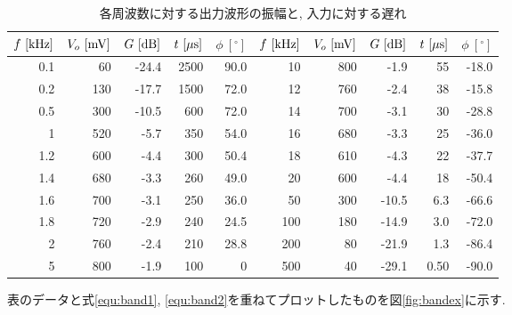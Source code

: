 \documentclass[titlepage]{jsarticle}
\begin{document}
        \begin{table}[h]
            \caption{各周波数に対する出力波形の振幅と, 入力に対する遅れ}
            \label{tab:band}
            \centering
            \begin{tabular}{r|rr|rr||r|rr|rr}
                $f \ [\rm{kHz}]$ & $V_o \ [\rm{mV]}$ & $G \ [\rm{dB}]$ & $t \ [\mu\rm{s}]$ & $\phi \ [^\circ]$ & $f \ [\rm{kHz}]$ & $V_o \ [\rm{mV]}$ & $G \ [\rm{dB}]$ & $t \ [\mu\rm{s}]$ & $\phi \ [^\circ]$ \\ \hline \hline
                0.1 & 60 & -24.4 & 2500 & 90.0 & 10 & 800 & -1.9 & 55 & -18.0 \\
                0.2 & 130 & -17.7 & 1500 & 72.0 & 12 & 760 & -2.4 & 38 & -15.8 \\
                0.5 & 300 & -10.5 & 600 & 72.0 & 14 & 700 & -3.1 & 30 & -28.8 \\
                1 & 520 & -5.7 & 350 & 54.0 & 16 & 680 & -3.3 & 25 & -36.0 \\
                1.2 & 600 & -4.4 & 300 & 50.4 & 18 & 610 & -4.3 & 22 & -37.7 \\
                1.4 & 680 & -3.3 & 260 & 49.0 & 20 & 600 & -4.4 & 18 & -50.4 \\
                1.6 & 700 & -3.1 & 250 & 36.0 & 50 & 300 & -10.5 & 6.3 & -66.6 \\
                1.8 & 720 & -2.9 & 240 & 24.5 & 100 & 180 & -14.9 & 3.0 & -72.0 \\
                2 & 760 & -2.4 & 210 & 28.8 & 200 & 80 & -21.9 & 1.3 & -86.4 \\
                5 & 800 & -1.9 & 100 & 0 & 500 & 40 & -29.1 & 0.50 & -90.0 \\
            \end{tabular}
        \end{table}

        表のデータと式\ref{equ:band1}, \ref{equ:band2}を重ねてプロットしたものを図\ref{fig:bandex}に示す.
\end{document}
